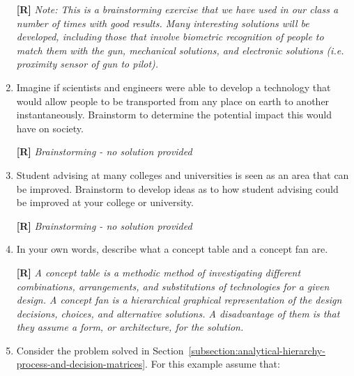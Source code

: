 \begin{enumerate}
  \begin{onlysolution}
  \textbf{[R]}
  \itshape
  \emph{Note:} This is a brainstorming exercise that we have used in 
  our class a number of times with good results. Many interesting solutions 
  will be developed, including those that involve biometric recognition of 
  people to match them with the gun, mechanical solutions, and electronic 
  solutions (i.e. proximity sensor of gun to pilot).

  \end{onlysolution}

\item
  Imagine if scientists and engineers were able to develop a technology
  that would allow people to be transported from any place on earth to
  another instantaneously. Brainstorm to determine the potential impact
  this would have on society.

  \begin{onlysolution}
  \textbf{[R]}
  \itshape
  Brainstorming - no solution provided
  \end{onlysolution}

\item
  Student advising at many colleges and universities is seen as an area
  that can be im­proved. Brainstorm to develop ideas as to how student
  advising could be improved at your college or university.

  \begin{onlysolution}
  \textbf{[R]}
  \itshape
  Brainstorming - no solution provided
  \end{onlysolution}

\item
  In your own words, describe what a concept table and a concept fan
  are.

  \begin{onlysolution}
  \textbf{[R]}
  \itshape
  A concept table is a methodic method of investigating different 
  combinations, arrangements, and substitutions of technologies for a 
  given design. A concept fan is a hierarchical graphical representation 
  of the design decisions, choices, and alternative solutions. A 
  disadvantage of them is that they assume a form, or architecture, 
  for the solution.
  \end{onlysolution}

\item
  Consider the problem solved in 
  Section~\ref{subsection:analytical-hierarchy-process-and-decision-matrices}. 
  For this example assume   that:
\begin{itemize}


\end{itemize}
\end{enumerate}
